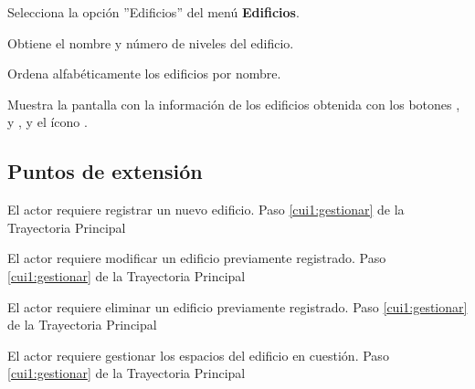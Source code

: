 \begin{UCtrayectoria}
	
	\UCpaso [\UCactor] Selecciona la opción ''Edificios'' del menú \textbf{Edificios}.
	
	\UCpaso [\UCsist] Obtiene el nombre y número de niveles del edificio.
	
	\UCpaso [\UCsist] Ordena alfabéticamente los edificios por nombre.
	
	\UCpaso[\UCsist] Muestra la pantalla  con la información de los edificios obtenida con los botones ,  y , y el ícono \btnRegistrar. 
	\label{cui1:gestionar}
\end{UCtrayectoria}

\subsection{Puntos de extensión}

\UCExtensionPoint 
{El actor requiere registrar un nuevo edificio.}
{Paso \ref{cui1:gestionar} de la Trayectoria Principal}
{}

\UCExtensionPoint 
{El actor requiere modificar un edificio previamente registrado.}
{Paso \ref{cui1:gestionar} de la Trayectoria Principal}
{}

\UCExtensionPoint 
{El actor requiere eliminar un edificio previamente registrado.}
{Paso \ref{cui1:gestionar} de la Trayectoria Principal}
{}

\UCExtensionPoint 
{El actor requiere gestionar los espacios del edificio en cuestión.}
{Paso \ref{cui1:gestionar} de la Trayectoria Principal}
{}